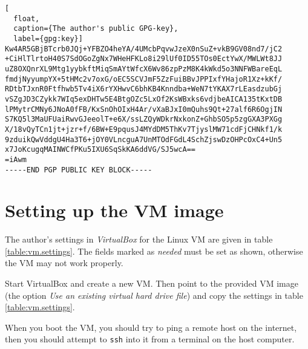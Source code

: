 \begin{lstlisting}[
  float,
  caption={The author's public GPG-key},
  label={gpg:key}]
Kw4AR5GBjBTcrb0JQj+YFBZO4heYA/4UMcbPqvwJzeX0nSuZ+vkB9GV08nd7/jC2
+CiHlTlrtoH40S7SdOGoZgNx7WHeHFKLo8i29lUf0ID55TOs0EctYwX/MWLWt8JJ
uZ8OXQnrXL9Mtg1yybkftMiqSmAYtWfcX6Wv86zpPzM8K4kWkd5o3NNFWBareEqL
fmdjNyyumpYX+5tHMc2v7oxG/oEC5SCVJmF5ZzFuiBBvJPPIxfYHajoR1Xz+kKf/
RDtbTJxnR0Ftfhwb5Tv4iX6rYXHwvC6bhKB4Knndba+WeN7tYKAX7rLEasdzubGj
vSZgJD3CZykk7WIq5exDHTw5E4BtgOZc5LxOf2KsWBxks6vdjbeAICA135tKxtDB
lPMytrCMNy6JNoA0fFB/KxSnOhOIxH4Ar/vXaBJxI0mQuhs9Qt+27alf6R6OgjIN
S7KQ5l3MaUFUaiRwvGJeeolT+e6X/ssLZQyWDkrNxkonZ+GhbSO5p5zgGXA3PXGg
X/18vQyTCn1jt+jzr+f/6BW+E9pqusJ4MYdDM5ThKv7TjyslMW71cdFjCHNkf1/k
9zduikQwVddgU4Ha3T6+jOY0VLncguA7UnMTOdFGdL4SchZjswDzOHPcOxC4+Un5
x7JoKcugqMAINWCfPKu5IXU6SqSkKA6ddVG/SJ5wcA==
=iAwm
-----END PGP PUBLIC KEY BLOCK-----
\end{lstlisting}
\clearpage %

\section{Setting up the VM image}

The author's settings in \textit{VirtualBox}
for the Linux VM are given in table
\vref{table:vm.settings}.  The fields marked as \textit{needed} must be set
as shown, otherwise the VM may not work properly.

Start VirtualBox and create a new VM.  Then point to the provided VM image
(the option \textit{Use an existing virtual hard drive file})
and copy the settings in table \vref{table:vm.settings}.

When you boot the VM, you should try to ping a remote host on the internet,
then you should attempt to \texttt{ssh} into it from a terminal on the host
computer.

